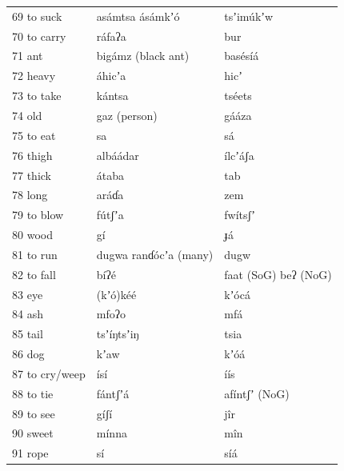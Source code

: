 \documentclass[output=paper]{langsci/langscibook}
\begin{document}
\begin{longtable}{p{}  p{} p{}}
69 to suck & asámtsa   ásámkʼ\'{o} & tsʼim\'{u}kʼw \\

70 to carry & ráfaʔa & bur \\

71 ant & bigámz    (black ant) & basésíá \\

72 heavy & áhicʼa & hicʼ \\

73 to take & kántsa & tséets \\

74 old & gaz   (person) & gááza \\

75 to eat & sa & sá \\

76 thigh & albáádar & ílcʼáʃa \\

77 thick & átaba & tab \\

78 long & aráɗa & zem \\

79 to blow & f\'{u}tʃʼa & fwítsʃʼ \\

80 wood & gí & ɟá \\

81 to run & dugwa     ranɗ\'{o}cʼa   (many) & dugw \\

82 to fall & bíʔé & faat (SoG)   beʔ (NoG) \\

83 eye & (kʼ\'{o})kéé & kʼ\'{o}cá \\

84 ash & mfoʔo & mfá \\

85 tail & tsʼíŋtsʼiŋ & tsia \\

86 dog & kʼaw & kʼ\'{o}á \\

87 to cry/weep & ísí & íís \\

88 to tie & fántʃʼá & afíntʃʼ (NoG) \\

89 to see & gíʃí & j\^{i}r \\

90 sweet & mínna & m\^{i}n \\

91 rope & sí & síá \\


\end{longtable}
\end{document}
